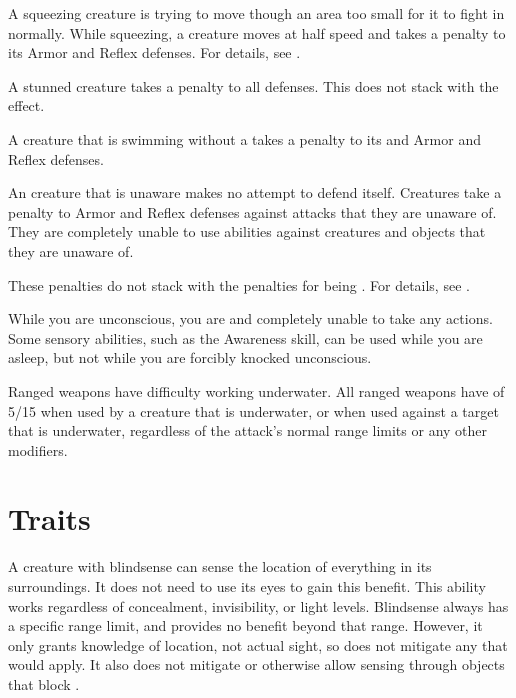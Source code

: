      A squeezing creature is trying to move though an area too small for it to fight in normally.
    While squeezing, a creature moves at half speed and takes a  penalty to its Armor and Reflex defenses.
    For details, see .

     A stunned creature takes a  penalty to all defenses.
    This does not stack with the \confused effect.

     A creature that is swimming without a  takes a  penalty to its  and Armor and Reflex defenses.

     An creature that is unaware makes no attempt to defend itself.
    Creatures take a  penalty to Armor and Reflex defenses against attacks that they are unaware of.
    They are completely unable to use  abilities against creatures and objects that they are unaware of.

    These penalties do not stack with the penalties for being \partiallyunaware.
    For details, see .

     While you are unconscious, you are \helpless and completely unable to take any actions.
    Some sensory abilities, such as the Awareness skill, can be used while you are asleep, but not while you are forcibly knocked unconscious.

     Ranged weapons have difficulty working underwater.
    All ranged weapons have  of 5/15 when used by a creature that is underwater, or when used against a target that is underwater, regardless of the attack's normal range limits or any other modifiers.

\newpage
\section{Traits}\label{Traits}

        A creature with blindsense can sense the location of everything in its surroundings.
        It does not need to use its eyes to gain this benefit.
        This ability works regardless of concealment, invisibility, or light levels.
        Blindsense always has a specific range limit, and provides no benefit beyond that range.
        However, it only grants knowledge of location, not actual sight, so does not mitigate any  that would apply.
        It also does not mitigate  or otherwise allow sensing through objects that block .

